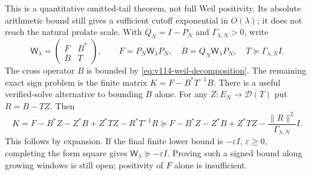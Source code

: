 This is a quantitative omitted-tail theorem, not full Weil positivity.
Its absolute arithmetic bound still gives a sufficient cutoff
exponential in $O(\lambda)$; it does not reach the natural prolate
scale. With $Q_N=I-P_N$ and $\Gamma_{\lambda,N}>0$, write
\[
 \mathsf W_\lambda=
 \begin{pmatrix}F&B^*\\B&T\end{pmatrix},\qquad
 F=P_N\mathsf W_\lambda P_N,\quad
 B=Q_N\mathsf W_\lambda P_N,\quad T\succeq\Gamma_{\lambda,N}I.
\]
The cross operator $B$ is bounded by \eqref{eq:v114-weil-decomposition}.
The remaining exact sign problem is the finite matrix
$K=F-B^*T^{-1}B$. There is a useful verified-solve alternative to
bounding $B$ alone. For any $Z:E_N\to\mathcal D(T)$ put $R=B-TZ$.
Then
\begin{equation}\label{eq:v114-schur-residual}
 K=F-B^*Z-Z^*B+Z^*TZ-R^*T^{-1}R
 \succeq F-B^*Z-Z^*B+Z^*TZ
             -\frac{\|R\|^2}{\Gamma_{\lambda,N}}I.
\end{equation}
This follows by expansion. If the final finite lower bound is
$-\varepsilon I$, $\varepsilon\ge0$, completing the form square
gives $\mathsf W_\lambda\succeq-\varepsilon I$.
Proving such a signed bound along growing windows is still open;
positivity of $F$ alone is insufficient.
